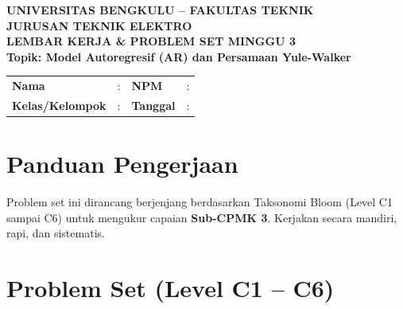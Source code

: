 \documentclass[11pt,a4paper]{article}
\begin{document}
\begin{center}
    {\large \textbf{\color{primaryblue}UNIVERSITAS BENGKULU -- FAKULTAS TEKNIK}}\\[0.1cm]
    {\large \textbf{\color{secondaryblue}JURUSAN TEKNIK ELEKTRO}}\\[0.25cm]
    {\LARGE \textbf{\color{primaryblue}LEMBAR KERJA \& PROBLEM SET MINGGU 3}}\\[0.1cm]
    {\normalsize \textbf{Topik: Model Autoregresif (AR) dan Persamaan Yule-Walker}}
\end{center}

\vspace{0.2cm}

\begin{tcolorbox}[colback=boxbg,colframe=primaryblue,arc=2mm,title=\textbf{Identitas Mahasiswa}]
\small
\begin{tabular}{p{2.5cm}p{5.5cm}p{2.5cm}p{4.5cm}}
\textbf{Nama} & : \dotfill & \textbf{NPM} & : \dotfill \\
\textbf{Kelas/Kelompok} & : \dotfill & \textbf{Tanggal} & : \dotfill \\
\end{tabular}
\end{tcolorbox}

\vspace{0.2cm}

\section{Panduan Pengerjaan}
Problem set ini dirancang berjenjang berdasarkan Taksonomi Bloom (Level C1 sampai C6) untuk mengukur capaian \textbf{Sub-CPMK 3}. Kerjakan secara mandiri, rapi, dan sistematis.

\section{Problem Set (Level C1 -- C6)}
\end{document}
